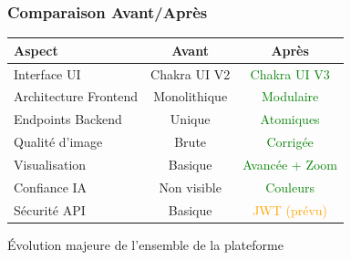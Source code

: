 \documentclass[
	11pt,
	aspectratio=169,
]{beamer}
\begin{document}
\begin{frame}
	\frametitle{Comparaison Avant/Après}
	
	\begin{table}
		\centering
		\small
		\begin{tabular}{lcc}
			\toprule
			\textbf{Aspect} & \textbf{Avant} & \textbf{Après} \\
			\midrule
			Interface UI & Chakra UI V2 & \textcolor{green}{Chakra UI V3} \\
			Architecture Frontend & Monolithique & \textcolor{green}{Modulaire} \\
			Endpoints Backend & Unique & \textcolor{green}{Atomiques} \\
			Qualité d'image & Brute & \textcolor{green}{Corrigée} \\
			Visualisation & Basique & \textcolor{green}{Avancée + Zoom} \\
			Confiance IA & Non visible & \textcolor{green}{Couleurs} \\
			Sécurité API & Basique & \textcolor{orange}{JWT (prévu)} \\
			\bottomrule
		\end{tabular}
	\end{table}
	
	\bigskip
	
	\centering
	\alert{Évolution majeure de l'ensemble de la plateforme}
\end{frame}



\end{document}
